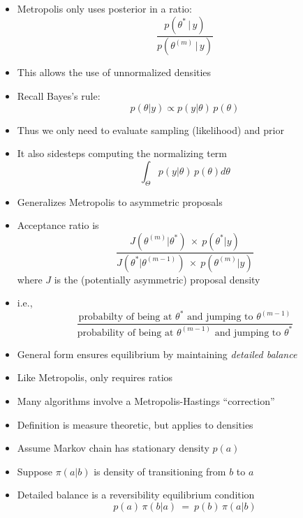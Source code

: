 \documentclass[10pt]{report}
\begin{document}
%
\begin{itemize}
\item Metropolis only uses posterior in a ratio:
\[
\frac{p(\theta^{*} \, | \, y)}
     {p(\theta^{(m)} \, | \, y)}
\]
\item This allows the use of unnormalized densities
\item Recall Bayes's rule:
\[
p(\theta | y) \propto p(y|\theta) \, p(\theta)
\]
\item Thus we only need to evaluate sampling (likelihood) and prior
\item It also sidesteps computing the normalizing term
\[
\int_{\Theta} p(y|\theta) \, p(\theta) d\theta
\]
\end{itemize}


%
\begin{itemize}
\item Generalizes Metropolis to asymmetric proposals
\item Acceptance ratio is
\[
\frac{J(\theta^{(m)}|\theta^{*}) \ \times \ p(\theta^{*}|y)}
     {J(\theta^{*}|\theta^{(m-1)}) \ \times \ p(\theta^{(m)}|y)}
\]
where $J$ is the (potentially asymmetric) proposal density
\item i.e., 
{\small
\[
\frac{\mbox{probabilty of being at } \theta^*
      \mbox{ and jumping to } \theta^{(m-1)}}
     {\mbox{probability of being at } \theta^{(m-1)}
      \mbox{ and jumping to } \theta^{*}}
\]
}
\vspace*{3pt}
\item General form ensures equilibrium 
  by maintaining \emph{detailed balance}
\item Like Metropolis, only requires ratios
\item Many algorithms involve a Metropolis-Hastings ``correction''
\end{itemize}


%
\begin{itemize}
\item Definition is measure theoretic, but applies to densities
\item Assume Markov chain has stationary density $p(a)$
\item Suppose $\pi(a | b)$ is density of
  transitioning from $b$ to $a$
\item Detailed balance is a reversibility equilibrium condition
\[
p(a) \,\pi(b | a)
\ = \
p(b) \, \pi(a | b)
\]
\end{itemize}
\end{document}
